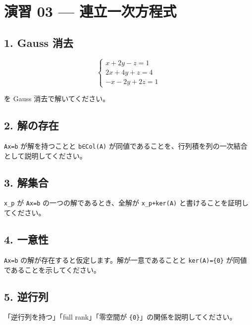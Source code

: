 \documentclass[
  11pt,
  a4paper,
]{ltjsarticle}
\author{}
\date{}
\begin{document}
\hypertarget{ux6f14ux7fd2-03-ux9023ux7acbux4e00ux6b21ux65b9ux7a0bux5f0f}{%
\section{演習 03 ---
連立一次方程式}\label{ux6f14ux7fd2-03-ux9023ux7acbux4e00ux6b21ux65b9ux7a0bux5f0f}}

\hypertarget{gauss-ux6d88ux53bb}{%
\subsection{1. Gauss 消去}\label{gauss-ux6d88ux53bb}}

\[
\begin{cases}
x+2y-z=1\\
2x+4y+z=4\\
-x-2y+2z=1
\end{cases}
\]

を Gauss 消去で解いてください。

\hypertarget{ux89e3ux306eux5b58ux5728}{%
\subsection{2. 解の存在}\label{ux89e3ux306eux5b58ux5728}}

\texttt{Ax=b} が解を持つことと \texttt{b∈Col(A)}
が同値であることを、行列積を列の一次結合として説明してください。

\hypertarget{ux89e3ux96c6ux5408}{%
\subsection{3. 解集合}\label{ux89e3ux96c6ux5408}}

\texttt{x\_p} が \texttt{Ax=b} の一つの解であるとき、全解が
\texttt{x\_p+ker(A)} と書けることを証明してください。

\hypertarget{ux4e00ux610fux6027}{%
\subsection{4. 一意性}\label{ux4e00ux610fux6027}}

\texttt{Ax=b} の解が存在すると仮定します。解が一意であることと
\texttt{ker(A)=\{0\}} が同値であることを示してください。

\hypertarget{ux9006ux884cux5217}{%
\subsection{5. 逆行列}\label{ux9006ux884cux5217}}

「逆行列を持つ」「full rank」「零空間が
\texttt{\{0\}}」の関係を説明してください。
\end{document}
